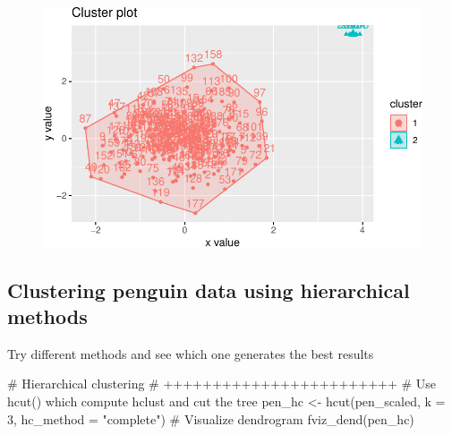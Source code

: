\documentclass[
  letterpaper,
  DIV=11,
  numbers=noendperiod]{scrreprt}
\newenvironment{Shaded}{\begin{snugshade}}{\end{snugshade}}
\newcommand{\AttributeTok}[1]{\textcolor[rgb]{0.40,0.45,0.13}{#1}}
\newcommand{\CommentTok}[1]{\textcolor[rgb]{0.37,0.37,0.37}{#1}}
\newcommand{\DecValTok}[1]{\textcolor[rgb]{0.68,0.00,0.00}{#1}}
\newcommand{\FunctionTok}[1]{\textcolor[rgb]{0.28,0.35,0.67}{#1}}
\newcommand{\NormalTok}[1]{\textcolor[rgb]{0.00,0.23,0.31}{#1}}
\newcommand{\OtherTok}[1]{\textcolor[rgb]{0.00,0.23,0.31}{#1}}
\newcommand{\StringTok}[1]{\textcolor[rgb]{0.13,0.47,0.30}{#1}}
\begin{document}
\begin{figure}[H]

{\centering \includegraphics{./12-clustering_files/figure-pdf/unnamed-chunk-9-2.pdf}

}

\end{figure}

\hypertarget{clustering-penguin-data-using-hierarchical-methods}{%
\subsection{Clustering penguin data using hierarchical
methods}\label{clustering-penguin-data-using-hierarchical-methods}}

Try different methods and see which one generates the best results

\begin{Shaded}
\begin{Highlighting}[]
\CommentTok{\# Hierarchical clustering}
\CommentTok{\# ++++++++++++++++++++++++}
\CommentTok{\# Use hcut() which compute hclust and cut the tree}
\NormalTok{pen\_hc }\OtherTok{\textless{}{-}} \FunctionTok{hcut}\NormalTok{(pen\_scaled, }\AttributeTok{k =} \DecValTok{3}\NormalTok{, }\AttributeTok{hc\_method =} \StringTok{"complete"}\NormalTok{)}
\CommentTok{\# Visualize dendrogram}
\FunctionTok{fviz\_dend}\NormalTok{(pen\_hc)}
\end{Highlighting}
\end{Shaded}
\end{document}
